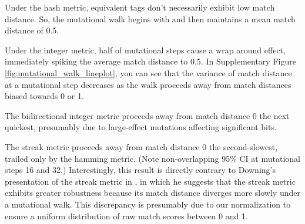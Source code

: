Under the hash metric, equivalent tags don't necessarily exhibit low match distance.
So, the mutational walk begins with and then maintains a mean match distance of 0.5.

Under the integer metric, half of mutational steps cause a wrap around effect, immediately spiking the average match distance to 0.5.
In Supplementary Figure \ref{fig:mutational_walk_lineplot}, you can see that the variance of match distance at a mutational step decreases as the walk proceeds away from match distances biased towards 0 or 1.

The bidirectional integer metric proceeds away from match distance 0 the next quickest, presumably due to large-effect mutations affecting significant bits.

The streak metric proceeds away from match distance 0 the second-slowest, trailed only by the hamming metric.
(Note non-overlapping 95\% CI at mutational steps 16 and 32.)
Interestingly, this result is directly contrary to Downing's presentation of the streak metric in \citep{downing2015intelligence}, in which he suggests that the streak metric exhibits greater robustness because its match distance diverges more slowly under a mutational walk.
This discrepancy is presumably due to our normalization to ensure a uniform distribution of raw match scores between 0 and 1.


